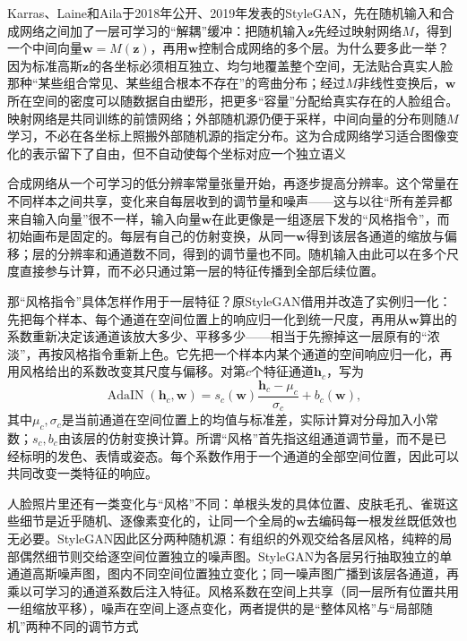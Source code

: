 Karras、Laine和Aila于2018年公开、2019年发表的StyleGAN，先在随机输入和合成网络之间加了一层可学习的“解耦”缓冲：把随机输入$\bm z$先经过映射网络$M$，得到一个中间向量$\bm{w}=M(\bm{z})$，再用$\bm{w}$控制合成网络的多个层。为什么要多此一举？因为标准高斯$\bm z$的各坐标必须相互独立、均匀地覆盖整个空间，无法贴合真实人脸那种“某些组合常见、某些组合根本不存在”的弯曲分布；经过$M$非线性变换后，$\bm{w}$所在空间的密度可以随数据自由塑形，把更多“容量”分配给真实存在的人脸组合。映射网络是共同训练的前馈网络；外部随机源仍便于采样，中间向量的分布则随$M$学习，不必在各坐标上照搬外部随机源的指定分布。这为合成网络学习适合图像变化的表示留下了自由，但不自动使每个坐标对应一个独立语义

合成网络从一个可学习的低分辨率常量张量开始，再逐步提高分辨率。这个常量在不同样本之间共享，变化来自每层收到的调节量和噪声——这与以往“所有差异都来自输入向量”很不一样，输入向量$\bm w$在此更像是一组逐层下发的“风格指令”，而初始画布是固定的。每层有自己的仿射变换，从同一$\bm{w}$得到该层各通道的缩放与偏移；层的分辨率和通道数不同，得到的调节量也不同。随机输入由此可以在多个尺度直接参与计算，而不必只通过第一层的特征传播到全部后续位置。

那“风格指令”具体怎样作用于一层特征？原StyleGAN借用并改造了实例归一化：先把每个样本、每个通道在空间位置上的响应归一化到统一尺度，再用从$\bm w$算出的系数重新决定该通道该放大多少、平移多少——相当于先擦掉这一层原有的“浓淡”，再按风格指令重新上色。它先把一个样本内某个通道的空间响应归一化，再用风格给出的系数改变其尺度与偏移。对第$c$个特征通道$\bm{h}_c$，写为
\begin{equation}
  \label{eq:neural-generative-stylegan-adain}
  \operatorname{AdaIN}(\bm{h}_c,\bm{w})
    =s_c(\bm{w})\frac{\bm{h}_c-\mu_c}{\sigma_c}
      +b_c(\bm{w}),
\end{equation}
其中$\mu_c,\sigma_c$是当前通道在空间位置上的均值与标准差，实际计算对分母加入小常数；$s_c,b_c$由该层的仿射变换计算。所谓“风格”首先指这组通道调节量，而不是已经标明的发色、表情或姿态。每个系数作用于一个通道的全部空间位置，因此可以共同改变一类特征的响应。

人脸照片里还有一类变化与“风格”不同：单根头发的具体位置、皮肤毛孔、雀斑这些细节是近乎随机、逐像素变化的，让同一个全局的$\bm w$去编码每一根发丝既低效也无必要。StyleGAN因此区分两种随机源：有组织的外观交给各层风格，纯粹的局部偶然细节则交给逐空间位置独立的噪声图。StyleGAN为各层另行抽取独立的单通道高斯噪声图，图内不同空间位置独立变化；同一噪声图广播到该层各通道，再乘以可学习的通道系数后注入特征。风格系数在空间上共享（同一层所有位置共用一组缩放平移），噪声在空间上逐点变化，两者提供的是“整体风格”与“局部随机”两种不同的调节方式

